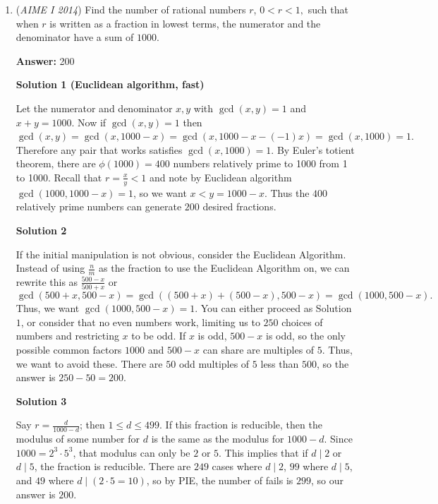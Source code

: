 \begin{enumerate}
 
 \begin{align*} 20\cdot16+30\cdot N&=29(16+N)\\ 320+30N&=464+29N\\ N&=\boxed{144} \end{align*}




	\item (\textit{AIME I 2014}) Find the number of rational numbers $r$, $0<r<1,$ such that when $r$ is written as a fraction in lowest terms, the numerator and the denominator have a sum of $1000$.


 
 \textbf{Answer: }200



\textbf{Solution 1 (Euclidean algorithm, fast)}

Let the numerator and denominator $x,y$ with $\gcd(x,y)=1$ and $x+y = 1000.$ Now if $\gcd(x,y) = 1$ then $\gcd(x,y) =\gcd(x,1000-x)= \gcd(x,1000-x-(-1)x)=\gcd(x,1000)=1.$ Therefore any pair that works satisfies $\gcd(x,1000)= 1.$ By Euler's totient theorem, there are $\phi(1000) = 400$ numbers relatively prime to 1000 from 1 to 1000. Recall that $r=\frac{x}{y}<1$ and note by Euclidean algorithm $\gcd(1000,1000-x)=1$, so we want $x<y=1000-x.$ Thus the $400$ relatively prime numbers can generate $\boxed{200}$ desired fractions.

 



\textbf{Solution 2}

If the initial manipulation is not obvious, consider the Euclidean Algorithm. Instead of using $\frac{n}{m}$ as the fraction to use the Euclidean Algorithm on, we can rewrite this as $\frac{500-x}{500+x}$ or 
 \[\gcd(500+x,500-x)=\gcd((500+x)+(500-x),500-x)=\gcd(1000,500-x).\] Thus, we want $\gcd(1000,500-x)=1$. You can either proceed as Solution $1$, or consider that no even numbers work, limiting us to $250$ choices of numbers and restricting $x$ to be odd. If $x$ is odd, $500-x$ is odd, so the only possible common factors $1000$ and $500-x$ can share are multiples of $5$. Thus, we want to avoid these. There are $50$ odd multiples of $5$ less than $500$, so the answer is $250-50=\boxed{200}$.

 



\textbf{Solution 3}

Say $r=\frac{d}{1000-d}$; then $1\leq d\leq499$. If this fraction is reducible, then the modulus of some number for $d$ is the same as the modulus for $1000-d$. Since $1000=2^3\cdot5^3$, that modulus can only be $2$ or $5$. This implies that if $d\mid2$ or $d\mid5$, the fraction is reducible. There are $249$ cases where $d\mid2$, $99$ where $d\mid5$, and $49$ where $d\mid(2\cdot5=10)$, so by PIE, the number of fails is $299$, so our answer is $\boxed{200}$.


\end{enumerate}

